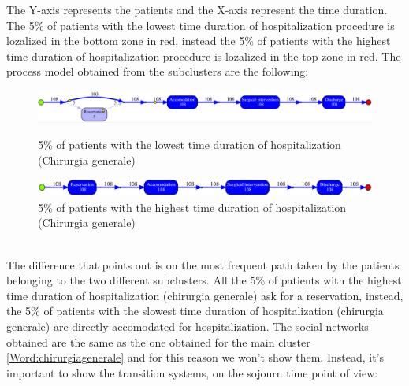 The Y-axis represents the patients and the X-axis represent the time duration. The 5\% of patients with the lowest time duration of hospitalization procedure is lozalized in the bottom zone in red, instead the 5\% of patients with the highest time duration of hospitalization procedure is lozalized in the top zone in red. The process model obtained from the subclusters are the following:
\begin{figure} [htbp]
\includegraphics[width=\textwidth , keepaspectratio]{RicoveriInductiveVisualMiner0901Fast}
\caption{5\% of patients with the lowest time duration of hospitalization (Chirurgia generale)}
\includegraphics[width=\textwidth , keepaspectratio]{RicoveriInductiveVisualMiner0901Slow}
\caption{5\% of patients with the highest time duration of hospitalization (Chirurgia generale)}
\end{figure}\\
The difference that points out is on the most frequent path taken by the patients belonging to the two different subclusters. All the 5\% of patients with the highest time duration of hospitalization (chirurgia generale) ask for a reservation, instead, the 5\% of patients with the slowest time duration of hospitalization (chirurgia generale) are directly accomodated for hospitalization. The social networks obtained are the same as the one obtained for the main cluster \ref{Word:chirurgiagenerale} and for this reason we won't show them. Instead, it's important to show the transition systems, on the sojourn time point of view:
